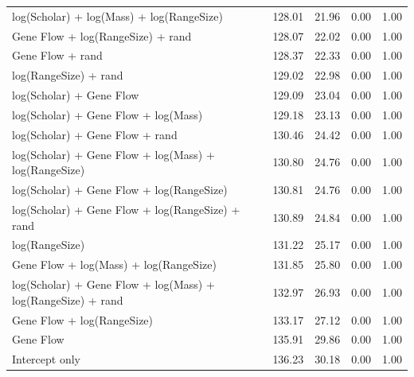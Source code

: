 \begin{table}[ht]
\begin{tabular}{@{}lrrrr@{}}
  log(Scholar) + log(Mass) + log(RangeSize) & 128.01 & 21.96 & 0.00 & 1.00 \\ 
  Gene Flow + log(RangeSize) + rand & 128.07 & 22.02 & 0.00 & 1.00 \\ 
  Gene Flow + rand & 128.37 & 22.33 & 0.00 & 1.00 \\ 
  log(RangeSize) + rand & 129.02 & 22.98 & 0.00 & 1.00 \\ 
  log(Scholar) + Gene Flow & 129.09 & 23.04 & 0.00 & 1.00 \\ 
  log(Scholar) + Gene Flow + log(Mass) & 129.18 & 23.13 & 0.00 & 1.00 \\ 
  log(Scholar) + Gene Flow + rand & 130.46 & 24.42 & 0.00 & 1.00 \\ 
  log(Scholar) + Gene Flow + log(Mass) + log(RangeSize) & 130.80 & 24.76 & 0.00 & 1.00 \\ 
  log(Scholar) + Gene Flow + log(RangeSize) & 130.81 & 24.76 & 0.00 & 1.00 \\ 
  log(Scholar) + Gene Flow + log(RangeSize) + rand & 130.89 & 24.84 & 0.00 & 1.00 \\ 
  log(RangeSize) & 131.22 & 25.17 & 0.00 & 1.00 \\ 
  Gene Flow + log(Mass) + log(RangeSize) & 131.85 & 25.80 & 0.00 & 1.00 \\ 
  log(Scholar) + Gene Flow + log(Mass) + log(RangeSize) + rand & 132.97 & 26.93 & 0.00 & 1.00 \\ 
  Gene Flow + log(RangeSize) & 133.17 & 27.12 & 0.00 & 1.00 \\ 
  Gene Flow & 135.91 & 29.86 & 0.00 & 1.00 \\ 
  Intercept only & 136.23 & 30.18 & 0.00 & 1.00 \\ 
   \bottomrule
\end{tabular}
\endgroup
\end{table}








